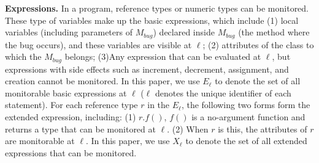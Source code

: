 \textbf{Expressions.} In a program, reference types or numeric types can be monitored. These type of variables make up the basic expressions, which include 
(1) local variables (including parameters of $M_{bug}$) declared inside $M_{bug}$ (the method where the bug occurs), and these variables are visible at $\ell$; (2) attributes of the class to which the $M_{bug}$ belongs; (3)Any expression that can be evaluated at $\ell$, but expressions with side effects such as increment, decrement, assignment, and creation cannot be monitored. In this paper, we use $E_{\ell}$ to denote the set of all monitorable basic expressions at $\ell$ ($\ell$ denotes the unique identifier of each statement). For each reference type $r$ in the $E_{\ell}$, the following two forms form the extended expression, including: (1) $r.f()$, $f()$ is a no-argument function and returns a type that can be monitored at $\ell$. (2) When $r$ is this, the attributes of $r$ are monitorable at $\ell$. In this paper, we use $X_{\ell}$ to denote the set of all extended expressions that can be monitored.

